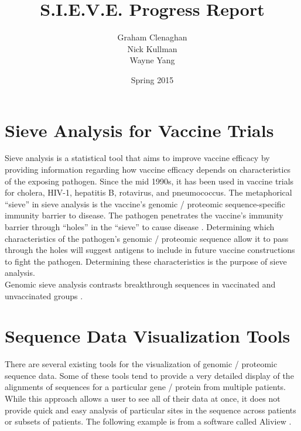 \documentclass{article}
\begin{document}
\title{S.I.E.V.E. Progress Report}
\author{Graham Clenaghan \\ Nick Kullman \\ Wayne Yang}
\date{Spring 2015}
\maketitle

\section{Sieve Analysis for Vaccine Trials}

Sieve analysis is a statistical tool that aims to improve vaccine efficacy by providing information regarding how vaccine efficacy depends on characteristics of the exposing pathogen. 
Since the mid 1990s, it has been used in vaccine trials for cholera, HIV-1, hepatitis B, rotavirus, and pneumococcus. 
The metaphorical ``sieve'' in sieve analysis is the vaccine's genomic / proteomic sequence-specific immunity barrier to disease. The pathogen penetrates the vaccine's immunity barrier through ``holes'' in the ``sieve'' to cause disease \cite{gilbert2001sieve}.
Determining which characteristics of the pathogen's genomic / proteomic sequence allow it to pass through the holes will suggest antigens to include in future vaccine constructions to fight the pathogen.
Determining these characteristics is the purpose of sieve analysis. 
\\
\noindent Genomic sieve analysis contrasts breakthrough sequences in vaccinated and unvaccinated groups \cite{edlefsen2014comprehensive}.


\section{Sequence Data Visualization Tools}

There are several existing tools for the visualization of genomic / proteomic sequence data.  Some of these tools tend to provide a very detailed display of the alignments of sequences for a particular gene / protein from multiple patients.  While this approach allows a user to see all of their data at once, it does not provide quick and easy analysis of particular sites in the sequence across patients or subsets of patients.  The following example is from a software called Aliview \cite{aliview}.
\end{document}

